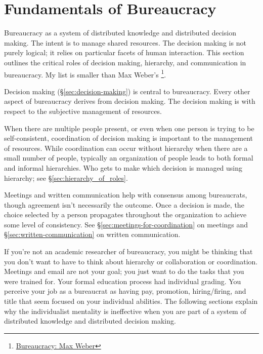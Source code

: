 \section{Fundamentals of Bureaucracy\label{fundamentals_of_b}}
  
Bureaucracy as a system of distributed knowledge and distributed decision making. The intent is to manage shared resources. The decision making is not purely logical; it relies on particular facets of human interaction. This section outlines the critical roles of decision making, hierarchy, and communication in bureaucracy. 
My list is smaller than Max Weber's \cite{2015_Weber}\footnote{\href{https://en.wikipedia.org/wiki/Bureaucracy\#Max_Weber}{Bureaucracy: Max Weber}}.

Decision making (\S\ref{sec:decision-making}) is central to bureaucracy. Every other aspect of bureaucracy derives from decision making. The decision making is with respect to the subjective management of resources. 

When there are multiple people present, or even when one person is trying to be self-consistent, coordination of decision making is important to the management of resources. While coordination can occur without hierarchy when there are a small number of people, typically an organization of people leads to both formal and informal hierarchies. Who gets to make which decision is managed using hierarchy; see \S\ref{sec:hierarchy_of_roles}.

Meetings and written communication help with consensus among bureaucrats, though agreement isn't necessarily the outcome.
Once a decision is made, the choice selected by a person propagates throughout the organization to achieve some level of consistency. See \S\ref{sec:meetings-for-coordination} on meetings and \S\ref{sec:written-communication} on written communication.

If you're not an academic researcher of bureaucracy, you might be thinking that you don't want to have to think about hierarchy or collaboration or coordination. Meetings and email are not your goal; you just want to do the tasks that you were trained for. Your formal education process had individual grading. You perceive your job as a bureaucrat as having pay, promotion, hiring/firing, and title that  seem focused on your individual abilities. The following sections explain why the individualist mentality is ineffective when you are part of a  system of distributed knowledge and distributed decision making. 


